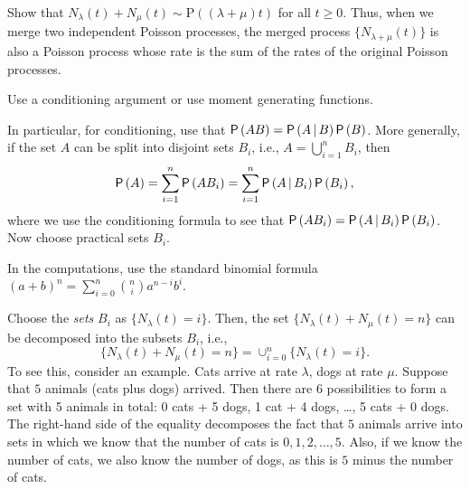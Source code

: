 \begin{exercise} 
Show that  $N_\lambda(t) + N_\mu(t) \sim \text{P}((\lambda + \mu)t)$ for all $t\geq 0$. Thus, when we merge two independent Poisson processes, the merged process $\{N_{\lambda+\mu}(t)\}$ is also a Poisson process whose rate is the sum of the rates of the original Poisson processes.
  \begin{hint}
Use a conditioning argument or use moment generating functions.

In particular, for
    conditioning, use that $\P{AB} = \P{A\given B}\P{B}$. More
    generally, if the set $A$ can be split into disjoint sets $B_i$,
    i.e., $A=\bigcup_{i=1}^n B_i$, then
    \begin{equation*}
      \P{A} = \sum_{i=1}^n \P{A B_i} = \sum_{i=1}^n \P{A\given B_i} \P{B_i},
    \end{equation*}
    where we use the conditioning formula to see that
    $\P{A B_i} = \P{A \given B_i} \P{B_i}$.  Now choose practical sets
    $B_i$.  

In the computations, use the standard binomial formula $(a+b)^n = \sum_{i=0}^n {n \choose i} a^{n-i} b^i$. 
  \end{hint}
    \begin{solution}
Choose the \emph{sets} $B_i$ as $\{N_\lambda(t) = i\}$. Then, the set $\{N_\lambda(t) + N_\mu(t) = n\}$ can be decomposed into the subsets $B_i$, i.e., 
\begin{equation*}
\{N_\lambda(t) + N_\mu(t) = n\} =  \cup_{i=0}^n \{N_\lambda(t) = i\}.
\end{equation*}
To see this, consider an example. Cats arrive at rate $\lambda$, dogs at rate $\mu$. Suppose that $5$ animals (cats plus dogs) arrived. Then  there are 6 possibilities to form a set with 5 animals in total: 0 cats + 5 dogs, 1 cat + 4 dogs, \ldots, 5 cats + 0 dogs. The right-hand side of the equality decomposes  the fact that $5$ animals arrive into sets in which we know that the number of cats is $0, 1, 2,\ldots, 5$. Also,  if we know the number of cats, we also know the number of dogs, as this is $5$ minus the number of cats. %


\end{solution}
\end{exercise}
